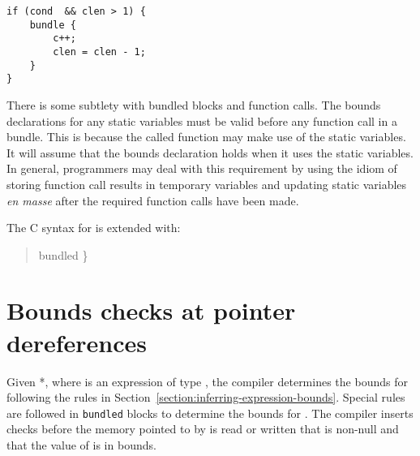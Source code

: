 \begin{verbatim}
if (cond  && clen > 1) {
    bundle {
        c++;
        clen = clen - 1;
    }
}
\end{verbatim}

There is some subtlety with bundled blocks and function calls. The
bounds declarations for any static variables must be valid before any
function call in a bundle. This is because the called function may make
use of the static variables. It will assume that the bounds declaration
holds when it uses the static variables. In general, programmers may
deal with this requirement by using the idiom of storing function call
results in temporary variables and updating static variables \textit{en
masse} after the required function calls have been made.

The C syntax for is extended with:


\begin{quote}
\end{quote}


\begin{quote}
bundled  \}
\end{quote}


\begin{quote}

\end{quote}


\begin{quote}

\end{quote}

\section{Bounds checks at pointer dereferences}
\label{section:bounds-checking-indirections}

Given *, where  is an expression of type
\arrayptr, the compiler determines the bounds for 
following the rules in Section~\ref{section:inferring-expression-bounds}.
Special rules are followed in
\texttt{bundled} blocks to determine the bounds for . The
compiler inserts checks before the memory pointed to by  is
read or written that  is non-null and that the value of
 is in bounds.

